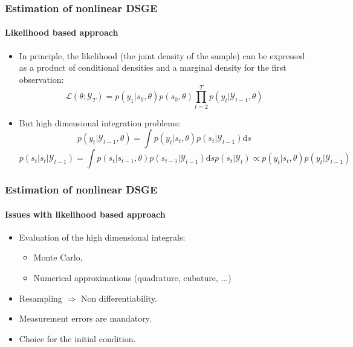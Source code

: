 \documentclass[10pt]{beamer}
\begin{document}
\begin{frame}
\frametitle{Estimation of nonlinear DSGE}
\framesubtitle{Likelihood based approach}

\begin{itemize}
\item In principle, the likelihood (the joint density of the sample) can be expressed as a product of conditional densities and a marginal density for the first observation:
  \[
    \mathcal L(\theta; \mathcal Y_T) = p(y_1|s_0, \theta)p(s_0, \theta)\prod_{t=2}^Tp(y_t|\mathcal Y_{t-1}, \theta)
  \]
  \bigskip
\item But high dimensional integration problems:
  \[
    p(y_t|\mathcal Y_{t-1}, \theta) = \int p(y_t|s_t, \theta)p(s_t|\mathcal Y_{t-1})\mathrm ds
  \]
  \begin{subequations}
    \begin{equation}
      \tag{Prediction}
      p(s_t|s_t|\mathcal Y_{t-1}) = \int p(s_t|s_{t-1},\theta)p(s_{t-1}|\mathcal Y_{t-1})\mathrm ds
    \end{equation}
    \begin{equation}
      \tag{Update, Bayes}
      p(s_{t}|\mathcal Y_{t}) \propto p(y_t|s_t,\theta)p(y_t|\mathcal Y_{t-1})
    \end{equation}
  \end{subequations}

\end{itemize}
\end{frame}


\begin{frame}
\frametitle{Estimation of nonlinear DSGE}
\framesubtitle{Issues with likelihood based approach}

\bigskip
\bigskip
  
\begin{itemize}

\item Evaluation of the high dimensional integrals:\newline

  \begin{itemize}
  \item Monte Carlo,
  \item Numerical approximations (quadrature, cubature, ...)
  \end{itemize}

  \bigskip

\item Resampling $\Rightarrow$ Non differentiability.\newline

  \bigskip

\item Measurement errors are mandatory.\newline

  \bigskip
  
\item Choice for the initial condition.
  
\end{itemize}

\end{frame}
\end{document}
